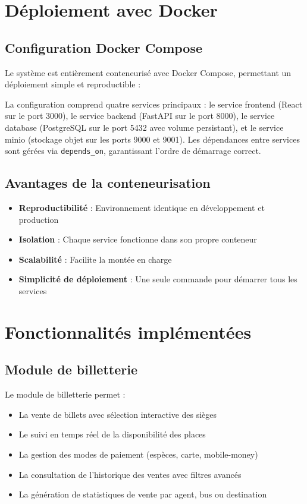 \documentclass[a4paper, 12pt]{book}
\begin{document}
\section{Déploiement avec Docker}

\subsection{Configuration Docker Compose}

Le système est entièrement conteneurisé avec Docker Compose, permettant un déploiement simple et reproductible :

La configuration comprend quatre services principaux : le service frontend (React sur le port 3000), le service backend (FastAPI sur le port 8000), le service database (PostgreSQL sur le port 5432 avec volume persistant), et le service minio (stockage objet sur les ports 9000 et 9001). Les dépendances entre services sont gérées via \texttt{depends\_on}, garantissant l'ordre de démarrage correct.

\subsection{Avantages de la conteneurisation}

\begin{itemize}
    \item \textbf{Reproductibilité} : Environnement identique en développement et production
    \item \textbf{Isolation} : Chaque service fonctionne dans son propre conteneur
    \item \textbf{Scalabilité} : Facilite la montée en charge
    \item \textbf{Simplicité de déploiement} : Une seule commande pour démarrer tous les services
\end{itemize}

\section{Fonctionnalités implémentées}

\subsection{Module de billetterie}

Le module de billetterie permet :
\begin{itemize}
    \item La vente de billets avec sélection interactive des sièges
    \item Le suivi en temps réel de la disponibilité des places
    \item La gestion des modes de paiement (espèces, carte, mobile-money)
    \item La consultation de l'historique des ventes avec filtres avancés
    \item La génération de statistiques de vente par agent, bus ou destination
\end{itemize}
\end{document}
